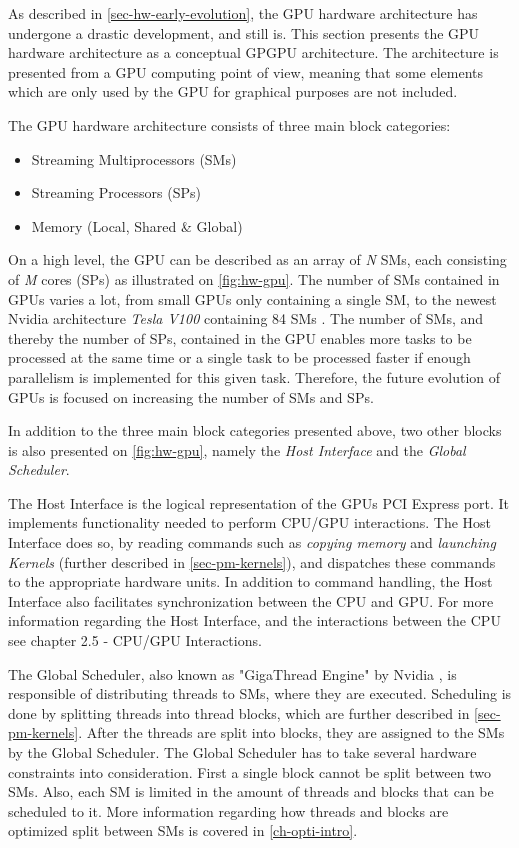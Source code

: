 As described in \cref{sec-hw-early-evolution}, the GPU hardware architecture has undergone a drastic development, and still is.
This section presents the GPU hardware architecture as a conceptual GPGPU architecture.
The architecture is presented from a GPU computing point of view, meaning that some elements which are only used by the GPU for graphical purposes are not included.

The GPU hardware architecture consists of three main block categories:
\begin{itemize}
	\item Streaming Multiprocessors (SMs)
	\item Streaming Processors (SPs) 
	\item Memory (Local, Shared \& Global)
\end{itemize}

On a high level, the GPU can be described as an array of \textit{N} SMs, each consisting of \textit{M} cores (SPs) as illustrated on \cref{fig:hw-gpu}. 
The number of SMs contained in GPUs varies a lot, from small GPUs only containing a single SM, to the newest Nvidia architecture \textit{Tesla V100} containing 84 SMs \cite{Nvidia2017}.
The number of SMs, and thereby the number of SPs, contained in the GPU enables more tasks to be processed at the same time or a single task to be processed faster if enough parallelism is implemented for this given task.
Therefore, the future evolution of GPUs is focused on increasing the number of SMs and SPs.


In addition to the three main block categories presented above, two other blocks is also presented on \cref{fig:hw-gpu}, namely the \textit{Host Interface} and the \textit{Global Scheduler}.

The Host Interface is the logical representation of the GPUs PCI Express port.
It implements functionality needed to perform CPU/GPU interactions. 
The Host Interface does so, by reading commands such as \textit{copying memory} and  \textit{launching Kernels} (further described in \cref{sec-pm-kernels}), and dispatches these commands to the appropriate hardware units.
In addition to command handling, the Host Interface also facilitates synchronization between the CPU and GPU. 
For more information regarding the Host Interface, and the interactions between the CPU see \cite{Wilt2013} chapter 2.5 - CPU/GPU Interactions.

The Global Scheduler, also known as "GigaThread Engine" by Nvidia \cite{Nvidia2009}, is responsible of distributing threads to SMs, where they are executed.
Scheduling is done by splitting threads into thread blocks, which are further described in \cref{sec-pm-kernels}.
After the threads are split into blocks, they are assigned to the SMs by the Global Scheduler.
The Global Scheduler has to take several hardware constraints into consideration.
First a single block cannot be split between two SMs.
Also, each SM is limited in the amount of threads and blocks that can be scheduled to it. 
More information regarding how threads and blocks are optimized split between SMs is covered in \cref{ch-opti-intro}.

